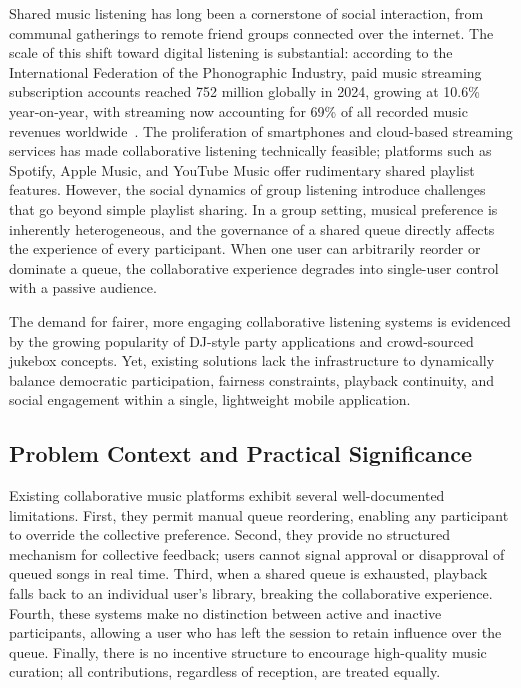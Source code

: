 \documentclass[pdflatex,sn-mathphys-num,iicol]{sn-jnl}
\theoremstyle{thmstyleone}%
\theoremstyle{thmstyletwo}%
\theoremstyle{thmstylethree}%
\begin{document}
Shared music listening has long been a cornerstone of social interaction, from communal
gatherings to remote friend groups connected over the internet. The scale of this shift
toward digital listening is substantial: according to the International Federation of the
Phonographic Industry, paid music streaming subscription accounts reached 752 million
globally in 2024, growing at 10.6\% year-on-year, with streaming now accounting for
69\% of all recorded music revenues worldwide~\cite{ifpi_gmr_2025}. The proliferation of
smartphones and cloud-based streaming services has made collaborative listening
technically feasible; platforms such as Spotify, Apple Music, and YouTube Music offer
rudimentary shared playlist features. However, the social dynamics of group listening
introduce challenges that go beyond simple playlist sharing. In a group setting, musical
preference is inherently heterogeneous, and the governance of a shared queue directly
affects the experience of every participant. When one user can arbitrarily reorder or
dominate a queue, the collaborative experience degrades into single-user control with a
passive audience.

The demand for fairer, more engaging collaborative listening systems is evidenced by the
growing popularity of DJ-style party applications and crowd-sourced jukebox concepts.
Yet, existing solutions lack the infrastructure to dynamically balance democratic
participation, fairness constraints, playback continuity, and social engagement within a
single, lightweight mobile application.

\subsection{Problem Context and Practical Significance}

Existing collaborative music platforms exhibit several well-documented limitations. First,
they permit manual queue reordering, enabling any participant to override the collective
preference. Second, they provide no structured mechanism for collective feedback; users
cannot signal approval or disapproval of queued songs in real time. Third, when a shared
queue is exhausted, playback falls back to an individual user's library, breaking the
collaborative experience. Fourth, these systems make no distinction between active and
inactive participants, allowing a user who has left the session to retain influence over
the queue. Finally, there is no incentive structure to encourage high-quality music
curation; all contributions, regardless of reception, are treated equally.
\end{document}
